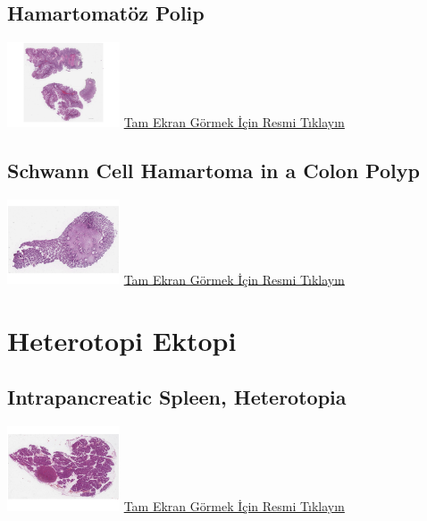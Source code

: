 \documentclass[
  letterpaper,
  DIV=11,
  numbers=noendperiod]{scrreprt}
\begin{document}
\hypertarget{sec-hamartomatoz-polip}{%
\section{Hamartomatöz Polip}\label{sec-hamartomatoz-polip}}

\href{https://images.patolojiatlasi.com/hamartomatouspolyp/HE.html}{\includegraphics[width=0.25\textwidth,height=\textheight]{./screenshots/thumbnail_hamartomatouspolyp.png}}
\href{https://images.patolojiatlasi.com/hamartomatouspolyp/HE.html}{Tam
Ekran Görmek İçin Resmi Tıklayın}

\hypertarget{sec-schwann-cell-hamartoma-colon-polyp}{%
\section{Schwann Cell Hamartoma in a Colon
Polyp}\label{sec-schwann-cell-hamartoma-colon-polyp}}

\href{https://images.patolojiatlasi.com/schwanncellhamartoma/HE.html}{\includegraphics[width=0.25\textwidth,height=\textheight]{./screenshots/thumbnail_schwanncellhamartoma.png}}
\href{https://images.patolojiatlasi.com/schwanncellhamartoma/HE.html}{Tam
Ekran Görmek İçin Resmi Tıklayın}

\hypertarget{sec-heterotopi-ektopi}{%
\chapter{Heterotopi Ektopi}\label{sec-heterotopi-ektopi}}

\hypertarget{sec-intrapancreatic-spleen}{%
\section{Intrapancreatic Spleen,
Heterotopia}\label{sec-intrapancreatic-spleen}}

\href{https://images.patolojiatlasi.com/intrapancreaticspleen/HE.html}{\includegraphics[width=0.25\textwidth,height=\textheight]{./screenshots/thumbnail_intrapancreaticspleen.png}}
\href{https://images.patolojiatlasi.com/intrapancreaticspleen/HE.html}{Tam
Ekran Görmek İçin Resmi Tıklayın}
\end{document}
